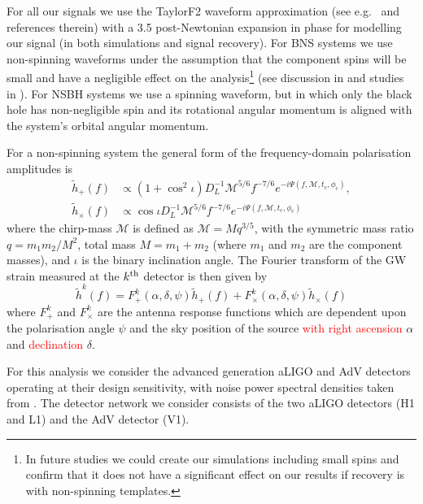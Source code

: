 \documentclass[prd, twocolumn, lengthcheck, superscriptaddress, showpacs, letterpaper, nofootinbib]{revtex4-1}
\newcommand{\gws}{\tilde{h}}
\newcommand{\refresp}[1]{\textcolor{red}{#1}}
\begin{document}
For all our signals we use the TaylorF2 waveform approximation (see e.g.~\cite{2009PhRvD..80h4043B}
and references therein) with a 3.5 post-Newtonian expansion in phase for
modelling our signal (in both simulations and signal recovery).  For \ac{BNS}
systems we use non-spinning waveforms under the assumption that the component spins will be small 
and have a negligible effect on the analysis\footnote{In future studies we could create our 
simulations including small spins and confirm that it does not have a significant effect on our 
results if recovery is with non-spinning templates.} (see discussion in \cite{2014ApJ...795..105S} 
and studies in \cite{2012PhRvD..86h4017B}). For \ac{NSBH} systems we use a spinning waveform, but in 
which only the black hole has non-negligible spin and its rotational angular momentum is aligned 
with the system's orbital angular momentum.

For a non-spinning system the general form of the frequency-domain polarisation
amplitudes is
%
\begin{align}\label{eq:signal} 
\gws_{+}(f) &\propto
\left(1+\cos^{2}\iota\right)D_{L}^{-1} \mathcal{M}^{5/6}f^{-7/6}e^{-i\Psi(f,
\mathcal{M}, t_\mathrm{c}, \phi_{\mathrm{c}})}, \nonumber \\
\gws_{\times}(f) &\propto
\cos{\iota}D_{L}^{-1}\mathcal{M}^{5/6} f^{-7/6}e^{-i\Psi(f, \mathcal{M},
t_\mathrm{c}, \phi_{\mathrm{c}})} 
\end{align}
%
where the chirp-mass $\mathcal{M}$ is defined as $\mathcal{M}=Mq^{3/5}$,
with the symmetric mass ratio $q=m_{1}m_{2}/M^{2}$, total mass
$M=m_{1}+m_{2}$ (where $m_{1}$ and $m_{2}$ are the component masses), and $\iota$ is
the binary inclination angle.  The Fourier transform of the \ac{GW} strain measured
at the $k^{\rm{th}}$ detector is then given by
%
\begin{equation} \label{eq:gravsig} 
\gws^{k}(f) = F_{+}^{k}(\alpha,
\delta, \psi)\gws_{+}(f) + F_{\times}^k(\alpha, \delta,
\psi)\gws_{\times}(f)
\end{equation}
%
where $F^{k}_{+}$ and $F^{k}_{\times}$ are the antenna response functions which
are dependent upon the polarisation angle $\psi$ and the sky position of the
source \refresp{with right ascension} $\alpha$ and \refresp{declination} $\delta$.

For this analysis we consider the advanced generation \ac{aLIGO} and
\ac{AdV} detectors operating at their design sensitivity, with noise power
spectral densities taken from \cite{2013arXiv1304.0670L}. The detector network
we consider consists of the two \ac{aLIGO} detectors (H1 and L1) and 
the \ac{AdV} detector (V1). 
\end{document}
